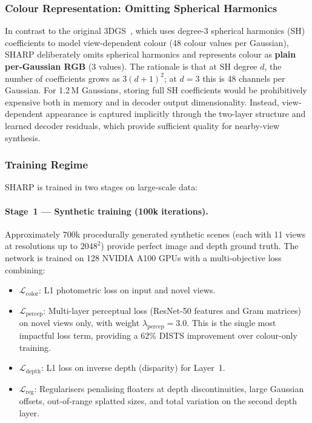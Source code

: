 \subsubsection{Colour Representation: Omitting Spherical Harmonics}

In contrast to the original 3DGS~\cite{kerbl20233dgs}, which uses degree-3 spherical harmonics (SH) coefficients to model view-dependent colour (48 colour values per Gaussian), SHARP deliberately omits spherical harmonics and represents colour as \textbf{plain per-Gaussian RGB} (3 values). The rationale is that at SH degree $d$, the number of coefficients grows as $3(d+1)^2$; at $d=3$ this is 48 channels per Gaussian. For 1.2\,M Gaussians, storing full SH coefficients would be prohibitively expensive both in memory and in decoder output dimensionality. Instead, view-dependent appearance is captured implicitly through the two-layer structure and learned decoder residuals, which provide sufficient quality for nearby-view synthesis.

\subsubsection{Training Regime}

SHARP is trained in two stages on large-scale data:

\paragraph{Stage~1 — Synthetic training (100k iterations).} Approximately 700k procedurally generated synthetic scenes (each with 11 views at resolutions up to $2048^2$) provide perfect image and depth ground truth. The network is trained on 128 NVIDIA A100 GPUs with a multi-objective loss combining:
\begin{itemize}
    \item $\mathcal{L}_{\text{color}}$: L1 photometric loss on input and novel views.
    \item $\mathcal{L}_{\text{percep}}$: Multi-layer perceptual loss (ResNet-50 features and Gram matrices) on novel views only, with weight $\lambda_{\text{percep}} = 3.0$. This is the single most impactful loss term, providing a 62\% DISTS improvement over colour-only training.
    \item $\mathcal{L}_{\text{depth}}$: L1 loss on inverse depth (disparity) for Layer~1.
    \item $\mathcal{L}_{\text{reg}}$: Regularisers penalising floaters at depth discontinuities, large Gaussian offsets, out-of-range splatted sizes, and total variation on the second depth layer.
\end{itemize}

